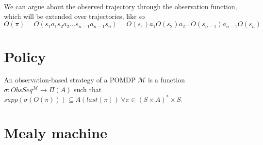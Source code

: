 We can argue about the observed trajectory through the observation function, which will be extended over trajectories, like so
\[O(\pi)=O(s_1 a_1 s_2 a_2\dots s_{n-1} a_{n-1} s_n) = O(s_1) a_1 O(s_2) a_2\dots O(s_{n-1}) a_{n-1} O(s_n)\]

\section*{Policy}
\begin{definition}
	An observation-based strategy of a POMDP $\mathcal{M}$ is a function $\sigma:ObsSeq^{\mathcal{M}}\to\Pi(A)$ such that $supp(\sigma(O(\pi)))\subseteq A (last(\pi))\ \forall \pi\in(S\times A)^*\times S$.
\end{definition}



\section*{Mealy machine}